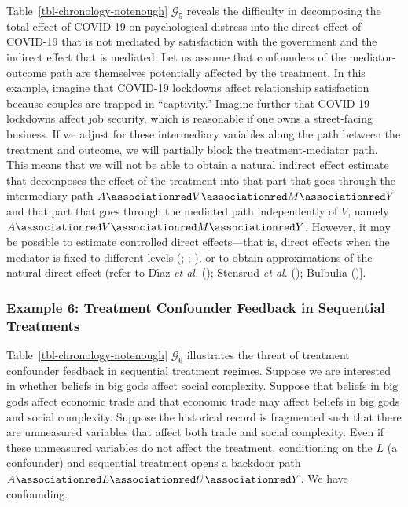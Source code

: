 \documentclass[
  single column]{article}
\begin{document}
Table~\ref{tbl-chronology-notenough} \(\mathcal{G}_5\) reveals the
difficulty in decomposing the total effect of COVID-19 on psychological
distress into the direct effect of COVID-19 that is not mediated by
satisfaction with the government and the indirect effect that is
mediated. Let us assume that confounders of the mediator-outcome path
are themselves potentially affected by the treatment. In this example,
imagine that COVID-19 lockdowns affect relationship satisfaction because
couples are trapped in ``captivity.'' Imagine further that COVID-19
lockdowns affect job security, which is reasonable if one owns a
street-facing business. If we adjust for these intermediary variables
along the path between the treatment and outcome, we will partially
block the treatment-mediator path. This means that we will not be able
to obtain a natural indirect effect estimate that decomposes the effect
of the treatment into that part that goes through the intermediary path
\(A \associationred V \associationred M \associationred Y\) and that
part that goes through the mediated path independently of \(V\), namely
\(A \associationred V \associationred M \associationred Y\). However, it
may be possible to estimate controlled direct effects---that is, direct
effects when the mediator is fixed to different levels
(;
;
), or to obtain
approximations of the natural direct effect (refer to Dı́az \emph{et al.}
(); Stensrud \emph{et al.}
(); Bulbulia
(){]}.

\subsubsection{Example 6: Treatment Confounder Feedback in Sequential
Treatments}\label{example-6-treatment-confounder-feedback-in-sequential-treatments}

Table~\ref{tbl-chronology-notenough} \(\mathcal{G}_6\) illustrates the
threat of treatment confounder feedback in sequential treatment regimes.
Suppose we are interested in whether beliefs in big gods affect social
complexity. Suppose that beliefs in big gods affect economic trade and
that economic trade may affect beliefs in big gods and social
complexity. Suppose the historical record is fragmented such that there
are unmeasured variables that affect both trade and social complexity.
Even if these unmeasured variables do not affect the treatment,
conditioning on the \(L\) (a confounder) and sequential treatment opens
a backdoor path
\(A \associationred L \associationred U \associationred Y\). We have
confounding.
\end{document}
